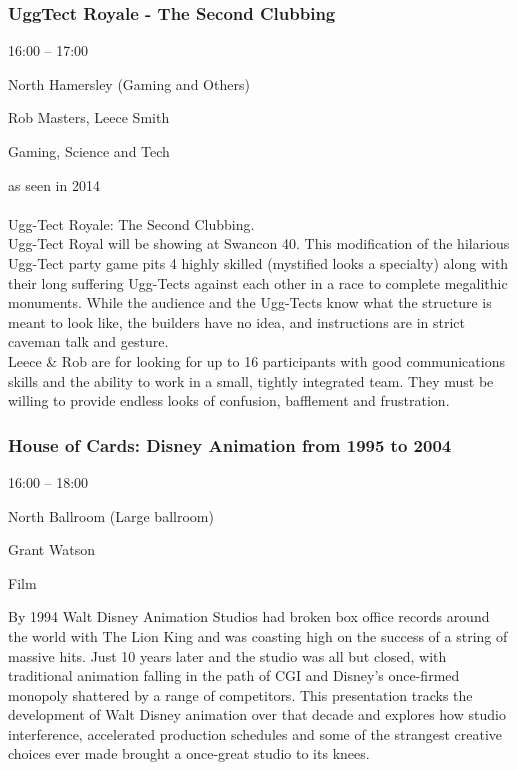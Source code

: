 \documentclass{scrreprt}
\begin{document}
\begin{multicols}{2}
\subsubsection*{UggTect Royale - The Second Clubbing}\begin{description}
\setlength{\itemsep}{0pt}
\setlength{\parsep}{0pt}
\setlength{\parskip}{0pt}
\item[Time:]{16:00 -- 17:00}
\item[Venue:]{North Hamersley (Gaming and Others)}
\item[People:]{Rob Masters, Leece Smith}
\item[Tags:]{Gaming, Science and Tech}\end{description}
as seen in 2014\\\\Ugg-Tect Royale: The Second Clubbing.\\ Ugg-Tect Royal will be showing at Swancon 40. This modification of the hilarious Ugg-Tect party game pits 4 highly skilled (mystified looks a specialty) along with their long suffering Ugg-Tects against each other in a race to complete megalithic monuments. While the audience and the Ugg-Tects know what the structure is meant to look like, the builders have no idea, and instructions are in strict caveman talk and gesture.\\Leece \& Rob are for looking for up to 16 participants with good communications skills and the ability to work in a small, tightly integrated team. They must be willing to provide endless looks of confusion, bafflement and frustration.
\subsubsection*{House of Cards: Disney Animation from 1995 to 2004}\begin{description}
\setlength{\itemsep}{0pt}
\setlength{\parsep}{0pt}
\setlength{\parskip}{0pt}
\item[Time:]{16:00 -- 18:00}
\item[Venue:]{North Ballroom (Large ballroom)}
\item[People:]{Grant Watson}
\item[Tags:]{Film}\end{description}
By 1994 Walt Disney Animation Studios had broken box office records around the world with The Lion King and was coasting high on the success of a string of massive hits. Just 10 years later and the studio was all but closed, with traditional animation falling in the path of CGI and Disney’s once-firmed monopoly shattered by a range of competitors. This presentation tracks the development of Walt Disney animation over that decade and explores how studio interference, accelerated production schedules and some of the strangest creative choices ever made brought a once-great studio to its knees.

\end{multicols}
\end{document}
